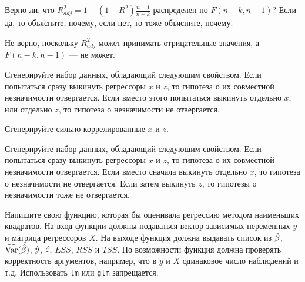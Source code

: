 \begin{problem}
Верно ли, что $R_{adj}^2 = 1 - (1 - R^2)\frac{n-1}{n-k}$ распределен по $F(n-k, n-1)$?
Если да, то объясните, почему, если нет, то тоже объясните, почему.


\begin{sol}
Не верно, поскольку $R_{adj}^2$ может принимать отрицательные значения, а $F(n-k, n-1)$ — не может.
\end{sol}
\end{problem}



\begin{problem}
Сгенерируйте набор данных, обладающий следующим свойством. Если попытаться сразу выкинуть регрессоры $x$ и $z$, то гипотеза о их совместной незначимости отвергается. Если вместо этого попытаться выкинуть отдельно $x$, или отдельно $z$, то гипотеза о незначимости не отвергается.


\begin{sol}
Сгенерируйте сильно коррелированные $x$ и $z$.
\end{sol}
\end{problem}



\begin{problem}
Сгенерируйте набор данных, обладающий следующим свойством. Если попытаться сразу выкинуть регрессоры $x$ и $z$, то гипотеза о их совместной незначимости отвергается. Если вместо сначала выкинуть отдельно $x$, то гипотеза о незначимости не отвергается. Если затем выкинуть $z$, то гипотезы о незначимости тоже не отвергается.


\begin{sol}
\end{sol}
\end{problem}


\begin{problem}
Напишите свою функцию, которая бы оценивала регрессию методом наименьших квадратов. На вход функции должны подаваться вектор зависимых переменных $y$ и матрица регрессоров $X$. На выходе функция должна выдавать список из $\hat{\beta}$, $\widehat{\operatorname{Var}}(\hat{\beta})$, $\hat{y}$, $\hat{\varepsilon}$, $ESS$, $RSS$ и $TSS$. По возможности функция должна проверять корректность аргументов, например, что в $y$ и $X$ одинаковое число наблюдений и т.д. Использовать \verb|lm| или \verb|glm| запрещается.


\begin{sol}
\end{sol}
\end{problem}



